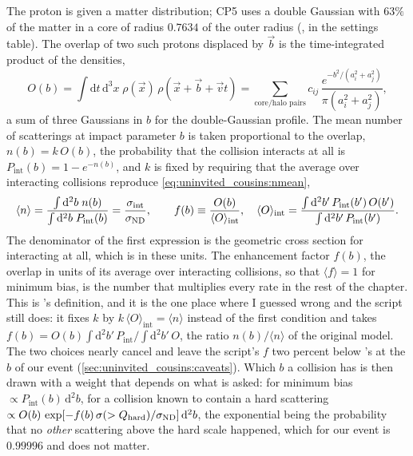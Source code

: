 The proton is given a matter distribution; CP5 uses a double Gaussian with
$63\%$ of the matter in a core of radius $0.7634$ of the outer radius
(,  in the \CMSSW settings table). The
overlap of two such protons displaced by $\vec b$ is the time-integrated
product of the densities,
\begin{equation}
  O(b)=\int\mathrm{d}t\,\mathrm{d}^3x\;\rho(\vec x)\,\rho(\vec x+\vec b+\vec v t)
  =\sum_{\text{core/halo pairs}}c_{ij}\,\frac{e^{-b^2/(a_i^2+a_j^2)}}{\pi(a_i^2+a_j^2)},
  \label{eq:uninvited_cousins:overlap}
\end{equation}
a sum of three Gaussians in $b$ for the double-Gaussian profile. The mean
number of scatterings at impact parameter $b$ is taken proportional to the
overlap, $n(b)=k\,O(b)$, the probability that the collision interacts at all
is $P_{\mathrm{int}}(b)=1-e^{-n(b)}$, and $k$ is fixed by requiring that the
average over interacting collisions reproduce \cref{eq:uninvited_cousins:nmean},
\begin{equation}
  \langle n\rangle=\frac{\int\mathrm{d}^2b\;n(b)}{\int\mathrm{d}^2b\;P_{\mathrm{int}}(b)}
  =\frac{\sigma_{\mathrm{int}}}{\sigma_{\mathrm{ND}}},
  \qquad
  f(b)\equiv\frac{O(b)}{\langle O\rangle_{\mathrm{int}}},
  \quad
  \langle O\rangle_{\mathrm{int}}=\frac{\int\mathrm{d}^2b'\,P_{\mathrm{int}}(b')\,O(b')}{\int\mathrm{d}^2b'\,P_{\mathrm{int}}(b')}.
  \label{eq:uninvited_cousins:fb}
\end{equation}
The denominator of the first expression is the geometric cross section for
interacting at all, which is \signd in these units. The enhancement factor
$f(b)$, the overlap in units of its average over interacting collisions, so
that $\langle f\rangle=1$ for minimum bias, is the number that multiplies
every rate in the rest of the chapter. This is \PYTHIA's definition, and it
is the one place where I guessed wrong and the script still does: it fixes
$k$ by $k\,\langle O\rangle_{\mathrm{int}}=\langle n\rangle$ instead of the
first condition and takes $f(b)=O(b)\int\mathrm{d}^2b'\,P_{\mathrm{int}}/\int\mathrm{d}^2b'\,O$,
the ratio $n(b)/\langle n\rangle$ of the original model. The two choices
nearly cancel and leave the script's $f$ two percent below \PYTHIA's at the
$b$ of our event (\cref{sec:uninvited_cousins:caveats}). Which
$b$ a collision has is then drawn with a weight that depends on what is
asked: for minimum bias $\propto P_{\mathrm{int}}(b)\,\mathrm{d}^2b$, for a
collision known to contain a hard scattering
$\propto O(b)\,\exp[-f(b)\,\sigma(>Q_{\mathrm{hard}})/\sigma_{\mathrm{ND}}]\,\mathrm{d}^2b$,
the exponential being the probability that no \emph{other} scattering above
the hard scale happened, which for our event is $0.99996$ and does not
matter.

